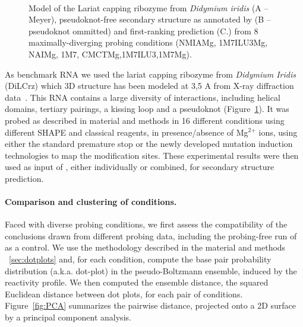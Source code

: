 \documentclass[a4,center,fleqn]{NAR}
\begin{document}
\begin{figure}
	{\\}
	
	\caption{Model of the Lariat capping ribozyme from {\itshape Didymium iridis} (A -- Meyer\etal\cite{Meyer2014}), pseudoknot-free secondary structure as annotated by  (B -- pseudoknot ommitted) and \OurTool first-ranking prediction (C.) from 8 maximally-diverging probing conditions (NMIAMg, 1M7ILU3Mg, NAIMg, 1M7, CMCTMg,1M7ILU3,1M7Mg).  \label{fig:didy}}
\end{figure}
As benchmark RNA we used the lariat capping ribozyme from \textit{Didymium Iridis} (DiLCrz) which 3D structure has been modeled at 3,5 A from X-ray diffraction data~\cite{Meyer2014}. This RNA contains a large diversity of interactions, including helical domains, tertiary pairings, a kissing loop and a pseudoknot (Figure~\ref{fig:didy}).
It was probed as described in material and methods in 16 different conditions using different SHAPE and classical reagents, in presence/absence of Mg$^\text{2+}$ ions, using either the standard premature stop or the newly developed mutation induction technologies to map the modification sites. These experimental results were then used as input of \OurTool{}, either individually or combined,  for secondary structure prediction. 


\paragraph{Comparison and clustering of conditions.}
Faced with diverse probing conditions, we first assess the compatibility of the conclusions drawn from different probing data, including the probing-free run of \OurTool as a control. We use the methodology described in the material and methods ~\ref{sec:dotplots} and, for each condition, compute the base pair probability distribution (a.k.a. dot-plot) in the  pseudo-Boltzmann ensemble, induced by the reactivity profile. We then computed the ensemble distance, the squared Euclidean distance between dot plots, for each pair of conditions. Figure~\ref{fig:PCA} summarizes the pairwise distance, projected onto a 2D surface by a principal component analysis.
\end{document}
